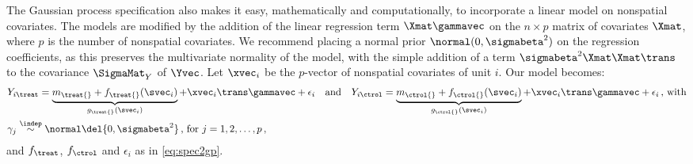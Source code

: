 The Gaussian process specification also makes it easy, mathematically and computationally, to incorporate a linear model on nonspatial covariates.
The models are modified by the addition of the linear regression term \(\Xmat \gammavec\) on the \(n \times p\) matrix of covariates \(\Xmat\), where \(p\) is the number of nonspatial covariates.
We recommend placing a normal prior \(\normal(0,\sigmabeta^2)\) on the regression coefficients, as this preserves the multivariate normality of the model, with the simple addition of a term \(\sigmabeta^2 \Xmat \Xmat\trans\) to the covariance \(\SigmaMat_Y\) of \(\Yvec\).
Let \(\xvec_i\) be the \(p\)-vector of nonspatial covariates of unit \(i\).
Our model becomes:
\begin{equation}
    \begin{split}
        & Y_{i\treat} = \underbrace{m_\treat{} + f_\treat{}(\svec_i)}_{g_\treat{}(\svec_i)} + \xvec_i\trans \gammavec + \epsilon_i \quad\text{and}\quad
        Y_{i\ctrol} = \underbrace{m_\ctrol{} + f_\ctrol{}(\svec_i)}_{g_\ctrol{}(\svec_i)} + \xvec_i\trans \gammavec + \epsilon_i \,\text{, with} \\
        & \gamma_j \overset{\indep}{\sim} \normal\del{0,\sigmabeta^2}\,\text{, for }j=1,2,\dotsc,p \,,
    \end{split}
    \label{eq:covariates_model}
\end{equation}
and \(f_\treat\), \(f_\ctrol\) and \(\epsilon_i\) as in \autoref{eq:spec2gp}.

